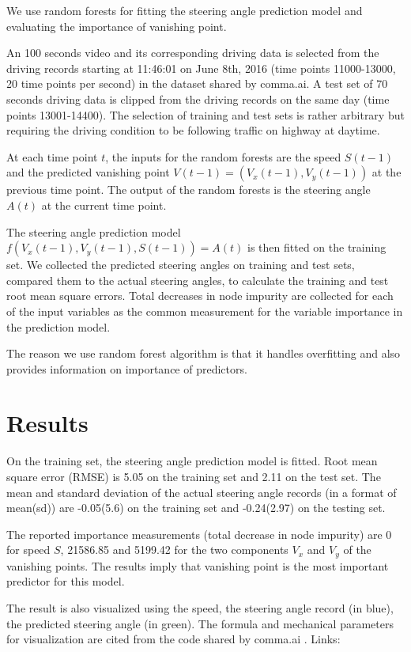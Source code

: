 \documentclass[11pt, oneside]{article}
\begin{document}
We use random forests for fitting the steering angle prediction model and evaluating the importance of vanishing point. 

An 100 seconds video and its corresponding driving data is selected from the driving records starting at 11:46:01 on June 8th, 2016 (time points 11000-13000, 20 time points per second) in the dataset shared by comma.ai. A test set of 70 seconds driving data is clipped from the driving records on the same day (time points 13001-14400). The selection of training and test sets is rather arbitrary but requiring the driving condition to be following traffic on highway at daytime. 

At each time point $t$, the inputs for the random forests are the speed $S(t-1)$ and the predicted vanishing point $V(t-1) = (V_x(t-1), V_y(t-1))$ at the previous time point. The output of the random forests is the steering angle $A(t)$ at the current time point. 

The steering angle prediction model $
f(V_x(t-1), V_y(t-1), S(t-1)) = A(t)
$ is then fitted on the training set. We collected the predicted steering angles on training and test sets, compared them to the actual steering angles, to calculate the training and test root mean square errors. Total decreases in node impurity are collected for each of the input variables as the common measurement for the variable importance in the prediction model. 

The reason we use random forest algorithm is that it handles overfitting and also provides information on importance of predictors. 



\section*{Results}

On the training set, the steering angle prediction model is fitted. Root mean square error (RMSE) is 5.05 on the training set and 2.11 on the test set. The mean and standard deviation of the actual steering angle records (in a format of mean(sd)) are -0.05(5.6) on the training set and -0.24(2.97) on the testing set. 

The reported importance measurements (total decrease in node impurity) are 0 for speed $S$, 21586.85 and 5199.42 for the two components $V_x$ and $V_y$ of the vanishing points. The results imply that vanishing point is the most important predictor for this model. 

The result is also visualized using the speed, the steering angle record (in blue), the predicted steering angle (in green). The formula and mechanical parameters for visualization are cited from the code shared by comma.ai \cite{github}. Links:
\end{document}
